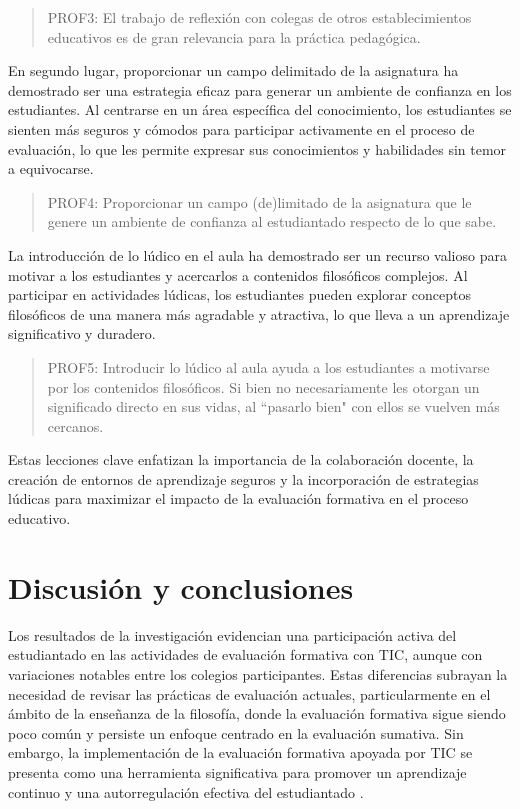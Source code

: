 \documentclass[spanish]{textolivre}
\begin{document}
\begin{quote}
    PROF3: El trabajo de reflexión con colegas de otros establecimientos educativos es de gran relevancia para la práctica pedagógica.
\end{quote}

En segundo lugar, proporcionar un campo delimitado de la asignatura ha demostrado ser una estrategia eficaz para generar un ambiente de confianza en los estudiantes. Al centrarse en un área específica del conocimiento, los estudiantes se sienten más seguros y cómodos para participar activamente en el proceso de evaluación, lo que les permite expresar sus conocimientos y habilidades sin temor a equivocarse.

\begin{quote}
    PROF4: Proporcionar un campo (de)limitado de la asignatura que le genere un ambiente de confianza al estudiantado respecto de lo que sabe.
\end{quote}

La introducción de lo lúdico en el aula ha demostrado ser un recurso valioso para motivar a los estudiantes y acercarlos a contenidos filosóficos complejos. Al participar en actividades lúdicas, los estudiantes pueden explorar conceptos filosóficos de una manera más agradable y atractiva, lo que lleva a un aprendizaje significativo y duradero.

\begin{quote}
    PROF5: Introducir lo lúdico al aula ayuda a los estudiantes a motivarse por los contenidos filosóficos. Si bien no necesariamente les otorgan un significado directo en sus vidas, al ``pasarlo bien" con ellos se vuelven más cercanos.
\end{quote}

Estas lecciones clave enfatizan la importancia de la colaboración docente, la creación de entornos de aprendizaje seguros y la incorporación de estrategias lúdicas para maximizar el impacto de la evaluación formativa en el proceso educativo.

\section{Discusión y conclusiones}
Los resultados de la investigación evidencian una participación activa del estudiantado en las actividades de evaluación formativa con TIC, aunque con variaciones notables entre los colegios participantes. Estas diferencias subrayan la necesidad de revisar las prácticas de evaluación actuales, particularmente en el ámbito de la enseñanza de la filosofía, donde la evaluación formativa sigue siendo poco común y persiste un enfoque centrado en la evaluación sumativa. Sin embargo, la implementación de la evaluación formativa apoyada por TIC se presenta como una herramienta significativa para promover un aprendizaje continuo y una autorregulación efectiva del estudiantado \cite{gallardo-fuentes2020, copado2022}.
\end{document}
